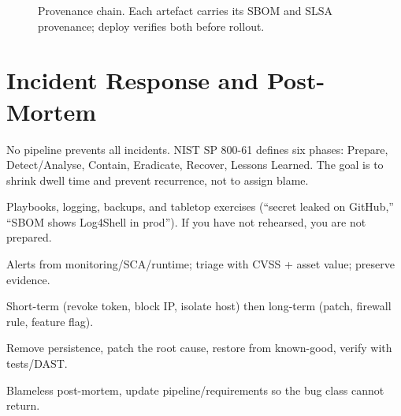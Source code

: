 \begin{figure}[h]\centering
{}
\caption{Provenance chain. Each artefact carries its SBOM and SLSA provenance; deploy verifies both before rollout.}
\label{fig:provenance}
\end{figure}

\section{Incident Response and Post-Mortem}
\label{sec:ir}
No pipeline prevents all incidents. NIST SP 800-61 defines six phases: Prepare, Detect/Analyse, Contain, Eradicate, Recover, Lessons Learned. The goal is to shrink dwell time and prevent recurrence, not to assign blame.

\begin{description}[leftmargin=1.2em,itemsep=0.35em]
    \item[Prepare] Playbooks, logging, backups, and tabletop exercises (``secret leaked on GitHub,'' ``SBOM shows Log4Shell in prod''). If you have not rehearsed, you are not prepared.
    \item[Detect \& analyse] Alerts from monitoring/SCA/runtime; triage with CVSS + asset value; preserve evidence.
    \item[Contain] Short-term (revoke token, block IP, isolate host) then long-term (patch, firewall rule, feature flag).
    \item[Eradicate \& recover] Remove persistence, patch the root cause, restore from known-good, verify with tests/DAST.
    \item[Lessons learned] Blameless post-mortem, update pipeline/requirements so the bug class cannot return.
\end{description}

